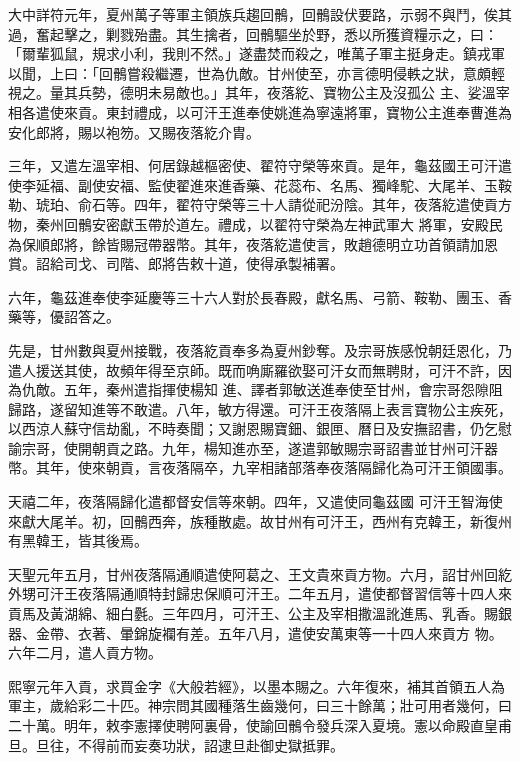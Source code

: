 \begin{pinyinscope}
 大中詳符元年，夏州萬子等軍主領族兵趨回鶻，回鶻設伏要路，示弱不與鬥，俟其過，奮起擊之，剿戮殆盡。其生擒者，回鶻驅坐於野，悉以所獲資糧示之，曰：「爾輩狐鼠，規求小利，我則不然。」遂盡焚而殺之，唯萬子軍主挺身走。鎮戎軍以聞，上曰：「回鶻嘗殺繼遷，世為仇敵。甘州使至，亦言德明侵軼之狀，意頗輕視之。量其兵勢，德明未易敵也。」其年，夜落紇、寶物公主及沒孤公
 主、娑溫宰相各遣使來貢。東封禮成，以可汗王進奉使姚進為寧遠將軍，寶物公主進奉曹進為安化郎將，賜以袍笏。又賜夜落紇介胄。



 三年，又遣左溫宰相、何居錄越樞密使、翟符守榮等來貢。是年，龜茲國王可汗遣使李延福、副使安福、監使翟進來進香藥、花蕊布、名馬、獨峰駝、大尾羊、玉鞍勒、琥珀、俞石等。四年，翟符守榮等三十人請從祀汾陰。其年，夜落紇遣使貢方物，秦州回鶻安密獻玉帶於道左。禮成，以翟符守榮為左神武軍大
 將軍，安殿民為保順郎將，餘皆賜冠帶器幣。其年，夜落紇遣使言，敗趙德明立功首領請加恩賞。詔給司戈、司階、郎將告敕十道，使得承製補署。



 六年，龜茲進奉使李延慶等三十六人對於長春殿，獻名馬、弓箭、鞍勒、團玉、香藥等，優詔答之。



 先是，甘州數與夏州接戰，夜落紇貢奉多為夏州鈔奪。及宗哥族感悅朝廷恩化，乃遣人援送其使，故頻年得至京師。既而唃廝羅欲娶可汗女而無聘財，可汗不許，因為仇敵。五年，秦州遣指揮使楊知
 進、譯者郭敏送進奉使至甘州，會宗哥怨隙阻歸路，遂留知進等不敢遣。八年，敏方得還。可汗王夜落隔上表言寶物公主疾死，以西涼人蘇守信劫亂，不時奏聞；又謝恩賜寶鈿、銀匣、曆日及安撫詔書，仍乞慰諭宗哥，使開朝貢之路。九年，楊知進亦至，遂遣郭敏賜宗哥詔書並甘州可汗器幣。其年，使來朝貢，言夜落隔卒，九宰相諸部落奉夜落隔歸化為可汗王領國事。



 天禧二年，夜落隔歸化遣都督安信等來朝。四年，又遣使同龜茲國
 可汗王智海使來獻大尾羊。初，回鶻西奔，族種散處。故甘州有可汗王，西州有克韓王，新復州有黑韓王，皆其後焉。



 天聖元年五月，甘州夜落隔通順遣使阿葛之、王文貴來貢方物。六月，詔甘州回紇外甥可汗王夜落隔通順特封歸忠保順可汗王。二年五月，遣使都督習信等十四人來貢馬及黃湖綿、細白氎。三年四月，可汗王、公主及宰相撒溫訛進馬、乳香。賜銀器、金帶、衣著、暈錦旋襴有差。五年八月，遣使安萬東等一十四人來貢方
 物。六年二月，遣人貢方物。



 熙寧元年入貢，求買金字《大般若經》，以墨本賜之。六年復來，補其首領五人為軍主，歲給彩二十匹。神宗問其國種落生齒幾何，曰三十餘萬；壯可用者幾何，曰二十萬。明年，敕李憲擇使聘阿裏骨，使諭回鶻令發兵深入夏境。憲以命殿直皇甫旦。旦往，不得前而妄奏功狀，詔逮旦赴御史獄抵罪。




\end{pinyinscope}
